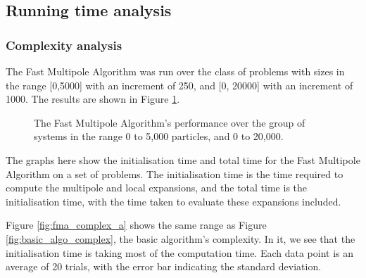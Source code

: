 \documentclass[pdftex,twoside,a4paper]{report}
\newcommand{\fma}{Fast Multipole Algorithm}
\begin{document}
\subsection{Running time analysis}
\subsubsection{Complexity analysis}
The \fma{} was run over the class of problems with sizes in the range [0,5000] with an increment of 250, and [0, 20000] with an increment of 1000. The results are shown in Figure \ref{fig:fma_complex}.
\begin{figure}
\caption{The \fma's performance over the group of systems in the range 0 to 5,000 particles, and 0 to 20,000.}
\label{fig:fma_complex}
\end{figure}

The graphs here show the initialisation time and total time for the \fma{} on a set of problems. The initialisation time is the time required to compute the multipole and local expansions, and the total time is the initialisation time, with the time taken to evaluate these expansions included.

Figure \ref{fig:fma_complex_a} shows the same range as Figure \ref{fig:basic_algo_complex}, the basic algorithm's complexity. In it, we see that the initialisation time is taking most of the computation time. Each data point is an average of 20 trials, with the error bar indicating the standard deviation.
\end{document}
